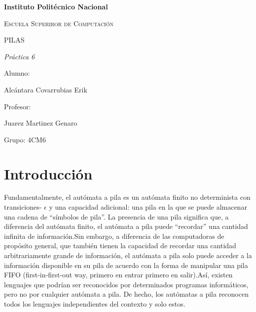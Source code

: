 \documentclass{article}
\begin{document}
\begin{titlepage}
\centering

{\bfseries\LARGE Instituto Polit\'ecnico Nacional \par}
\vspace{1cm}
{\scshape\Large Escuela Superiror de Computaci\'on \par}
\vspace{3cm}
{\scshape\Huge  PILAS \par}
\vspace{3cm}
{\itshape\Large Pr\'actica 6 \par}
\vfill
{\Large Alumno: \par}
{\Large Alcántara Covarrubias Erik \par}
{\Large Profesor: \par}
{\Large Juarez Martinez Genaro \par}
{\Large Grupo: 4CM6\par}
\vfill
\end{titlepage}

\section{Introducci\'on}
Fundamentalmente, el autómata a pila es un autómata finito no determinista con transiciones- $\epsilon$ y una capacidad adicional: una pila en la que se puede almacenar una cadena de “símbolos de pila”. La presencia de una pila significa que, a diferencia del autómata finito, el autómata a pila puede “recordar” una cantidad infinita de información.\newline \newline Sin embargo, a diferencia de las computadoras de propósito general, que también tienen la capacidad de recordar una cantidad arbitrariamente grande de información, el autómata a pila solo puede acceder a la información disponible en su pila de acuerdo con la forma de manipular una pila FIFO (first-in-first-out way, primero en entrar primero en salir).\newline\newline Así, existen lenguajes que podrían ser reconocidos por determinados programas informáticos, pero no por cualquier autómata a pila. De hecho, los autómatas a pila reconocen todos los lenguajes independientes del contexto y solo estos.
\end{document}
